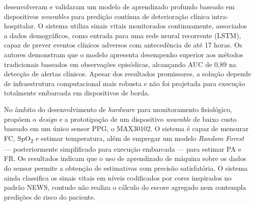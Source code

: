  desenvolveram e validaram um modelo de aprendizado profundo baseado em dispositivos \textit{wearables} para predição contínua de deterioração clínica intra-hospitalar. O sistema utiliza sinais vitais monitorados continuamente, associados a dados demográficos, como entrada para uma rede neural recorrente (LSTM), capaz de prever eventos clínicos adversos com antecedência de até 17 horas. Os autores demonstram que o modelo apresenta desempenho superior aos métodos tradicionais baseados em observações episódicas, alcançando AUC de 0,89 na detecção de alertas clínicos. Apesar dos resultados promissores, a solução depende de infraestrutura computacional mais robusta e não foi projetada para execução totalmente embarcada em dispositivos de borda.

No âmbito do desenvolvimento de \textit{hardware} para monitoramento fisiológico,  propõem o \textit{design} e a prototipação de um dispositivo \textit{wearable} de baixo custo baseado em um único sensor PPG, o MAX30102. O sistema é capaz de mensurar FC, SpO\textsubscript{2} e estimar temperatura, além de empregar um modelo \textit{Random Forest} — posteriormente simplificado para execução embarcada — para estimar PA e FR. Os resultados indicam que o uso de aprendizado de máquina sobre os dados do sensor permite a obtenção de estimativas com precisão satisfatória. O sistema ainda classifica os sinais vitais em níveis codificados por cores inspirados no padrão NEWS, contudo não realiza o cálculo do escore agregado nem contempla predições de risco do paciente.



